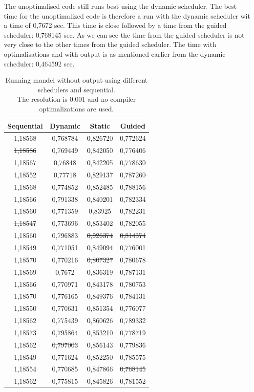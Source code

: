 \documentclass[a4paper]{article}
\begin{document}
	\noindent The unoptimalised code still runs best using the dynamic scheduler. 
	The best time for the unoptimalized code is therefore a run with the dynamic scheduler wit a time of 0,7672 sec.
	This time is close followed by a time from the guided scheduler: 0,768145 sec.
	As we can see the time from the guided scheduler is not very close to the other times from the guided scheduler.
	The time with optimalisations and with output is as mentioned earlier from the dynamic scheduler: 0,464592 sec.

	\begin{table}
		\caption{Running mandel without output using different schedulers and sequential.\\The resolution is 0.001 and no compiler optimalizations are used.}
		\label{table:mandel_nout_schedulers}
		\begin{center}
			\begin{tabular}{| c | c | c | c |}
				\hline
				Sequential & Dynamic & Static & Guided\\ 
				\hline
				1,18568 & 0,768784 & 0,826720 & 0,772624\\ 
				\st{1,18586} & 0,769449 & 0,842050 & 0,776406\\ 
				1,18567 & 0,76848 & 0,842205 & 0,778630\\ 
				1,18552 & 0,77718 & 0,829137 & 0,787260\\ 
				1,18568 & 0,774852 & 0,852485 & 0,788156\\ 
				1,18566 & 0,791338 & 0,840201 & 0,782334\\ 
				1,18560 & 0,771359 & 0,83925 & 0,782231\\ 
				\st{1,18547} & 0,773696 & 0,853402 & 0,782055\\ 
				1,18560 & 0,796883 & \st{0,926374} & \st{0,814374}\\ 
				1,18549 & 0,771051 & 0,849094 & 0,776001\\ 
				1,18570 & 0,770216 & \st{0,807327} & 0,780678\\ 
				1,18569 & \st{0,7672} & 0,836319 & 0,787131\\ 
				1,18566 & 0,770971 & 0,843178 & 0,780753\\ 
				1,18570 & 0,776165 & 0,849376 & 0,784131\\ 
				1,18550 & 0,770631 & 0,851354 & 0,776077\\ 
				1,18562 & 0,775439 & 0,860626 & 0,789332\\ 
				1,18573 & 0,795864 & 0,853210 & 0,778719\\ 
				1,18562 & \st{0,797003} & 0,856143 & 0,779836\\ 
				1,18549 & 0,771624 & 0,852250 & 0,785575\\ 
				1,18554 & 0,770685 & 0,847866 & \st{0,768145}\\ 
				\hline
				1,18562 & 0,775815 & 0,845826 & 0,781552\\ 
				\hline
			\end{tabular}
		\end{center}
	\end{table}
\end{document}
